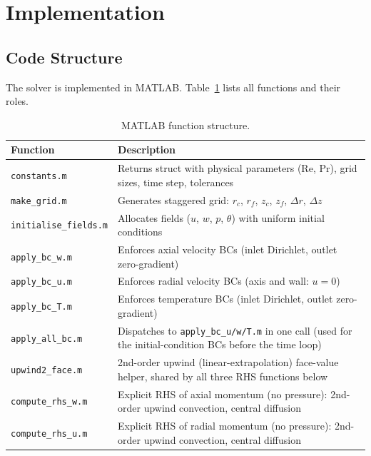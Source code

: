 \documentclass[12pt,a4paper]{article}
\newcommand{\Rey}{\text{Re}}
\newcommand{\Pran}{\text{Pr}}
\begin{document}
\newpage

\section{Implementation}

\subsection{Code Structure}

The solver is implemented in MATLAB.
Table~\ref{tab:modules} lists all functions and their roles.

\begin{table}[H]
\centering
\caption{MATLAB function structure.}
\label{tab:modules}
\begin{tabular}{lp{8.5cm}}
\toprule
\textbf{Function} & \textbf{Description} \\
\midrule
\texttt{constants.m}          & Returns struct with physical parameters ($\Rey$, $\Pran$), grid sizes, time step, tolerances \\
\texttt{make\_grid.m}         & Generates staggered grid: $r_c$, $r_f$, $z_c$, $z_f$, $\Delta r$, $\Delta z$ \\
\texttt{initialise\_fields.m} & Allocates fields ($u$, $w$, $p$, $\theta$) with uniform initial conditions \\
\texttt{apply\_bc\_w.m}       & Enforces axial velocity BCs (inlet Dirichlet, outlet zero-gradient) \\
\texttt{apply\_bc\_u.m}       & Enforces radial velocity BCs (axis and wall: $u=0$) \\
\texttt{apply\_bc\_T.m}       & Enforces temperature BCs (inlet Dirichlet, outlet zero-gradient) \\
\texttt{apply\_all\_bc.m}     & Dispatches to \texttt{apply\_bc\_u/w/T.m} in one call (used for the initial-condition BCs before the time loop) \\
\texttt{upwind2\_face.m}      & 2nd-order upwind (linear-extrapolation) face-value helper, shared by all three RHS functions below \\
\texttt{compute\_rhs\_w.m}    & Explicit RHS of axial momentum (no pressure): 2nd-order upwind convection, central diffusion \\
\texttt{compute\_rhs\_u.m}    & Explicit RHS of radial momentum (no pressure): 2nd-order upwind convection, central diffusion \\

\end{tabular}
\end{table}
\end{document}
